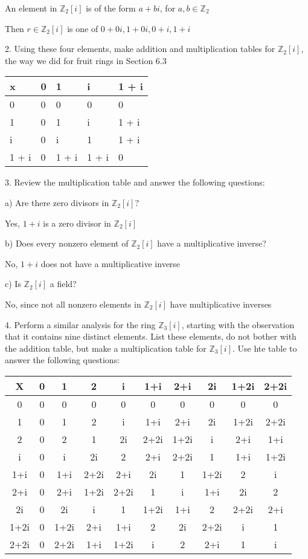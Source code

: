 \documentclass[12pt]{article}
\begin{document}
\begin{itemize}
	An element in $\mathbb{Z}_2[i]$ is of the form $a + bi$, for $a, b \in \mathbb{Z}_2$

	Then $r \in \mathbb{Z}_2[i]$ is one of $0+0i , 1+0i, 0+i, 1+ i$

2. Using these four elements, make addition and multiplication tables for $\mathbb{Z}_2[i]$, the way we did for fruit rings in Section 6.3

\begin{tabular}{l|l l l l}

x 		& 0 & 1 		& i 		& 1 + i\\

\hline

0			& 0	& 0 		& 0 		& 0\\

1			& 0	& 1 		& i 		& 1 + i\\

i			& 0	&	i			&	1 		& 1 + i\\
1 + i & 0 & 1 + i & 1 + i & 0\\
\end{tabular}

3. Review the multiplication table and answer the following questions:

a) Are there zero divisors in $\mathbb{Z}_2[i]?$

Yes, $1 + i$ is a zero divisor in $\mathbb{Z}_2[i]$

b) Does every nonzero element of $\mathbb{Z}_2[i]$ have a multiplicative inverse?

No, $1+i$ does not have a multiplicative inverse

c) Is $\mathbb{Z}_2[i]$ a field?

No, since not all nonzero elements in $\mathbb{Z}_2[i]$ have multiplicative inverses

4. Perform a similar analysis for the ring $\mathbb{Z}_3[i]$, starting with the observation that it contains nine distinct elements. List these elements, do not bother with the addition table, but make a multiplication table for $\mathbb{Z}_3[i]$. Use hte table to answer the following questions:

\begin{tabular}{c|ccccccccc}
\hline 
	X & 0 & 1 & 2 & i & 1+i & 2+i & 2i & 1+2i & 2+2i \\ 
\hline 
	0 & 0 & 0 & 0 & 0 & 0 & 0 & 0 & 0 & 0 \\
1 & 0 & 1 & 2 & i & 1+i & 2+i & 2i & 1+2i & 2+2i \\  
2 & 0 & 2 & 1 & 2i & 2+2i & 1+2i & i & 2+i & 1+i \\ 
i & 0 & i & 2i & 2 & 2+i & 2+2i & 1 & 1+i & 1+2i \\  
1+i & 0 & 1+i & 2+2i & 2+i & 2i & 1 & 1+2i & 2 & i \\  
2+i & 0 & 2+i & 1+2i & 2+2i & 1 & i & 1+i & 2i & 2 \\  
2i & 0 & 2i & i & 1 & 1+2i & 1+i & 2 & 2+2i & 2+i \\  
1+2i & 0 & 1+2i & 2+i & 1+i & 2 & 2i & 2+2i & i & 1 \\  
2+2i & 0 & 2+2i & 1+i & 1+2i & i & 2 & 2+i & 1 & i \\  
\end{tabular}


\end{itemize}
\end{document}
